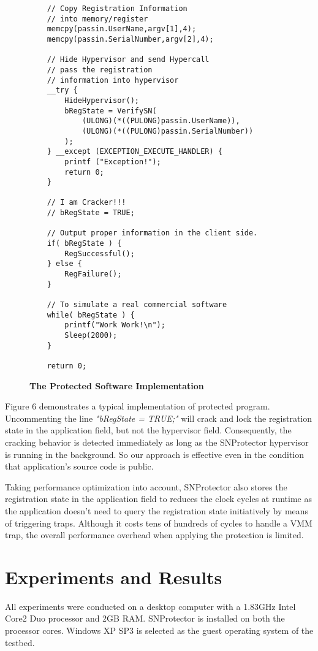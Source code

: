 \documentclass[conference]{IEEEtran}
\begin{document}
{\begin{figure}[!htb]
\begin{lstlisting}
    // Copy Registration Information
    // into memory/register
    memcpy(passin.UserName,argv[1],4);
    memcpy(passin.SerialNumber,argv[2],4);

    // Hide Hypervisor and send Hypercall
    // pass the registration
    // information into hypervisor
    __try {
        HideHypervisor();
        bRegState = VerifySN(
            (ULONG)(*((PULONG)passin.UserName)),
            (ULONG)(*((PULONG)passin.SerialNumber))
        );
    } __except (EXCEPTION_EXECUTE_HANDLER) {
        printf ("Exception!");
        return 0;
    }

    // I am Cracker!!!
    // bRegState = TRUE;

    // Output proper information in the client side.
    if( bRegState ) {
        RegSuccessful();
    } else {
        RegFailure();
    }

    // To simulate a real commercial software
    while( bRegState ) {
        printf("Work Work!\n");
        Sleep(2000);
    }

    return 0;
\end{lstlisting}
\caption{{\bf The Protected Software Implementation}}
\label{Figure 10.}
\end{figure}

Figure 6 demonstrates a typical implementation of protected
program. Uncommenting the line \emph{"bRegState = TRUE;"} will
crack and lock the registration state in the application field,
but not the hypervisor field. Consequently, the cracking behavior
is detected immediately as long as the SNProtector hypervisor is
running in the background. So our approach is effective even in
the condition that application's source code is public.

Taking performance optimization into account, SNProtector also
stores the registration state in the application field to reduces
the clock cycles at runtime as the application doesn't need to
query the registration state initiatively by means of triggering
traps. Although it costs tens of hundreds of cycles to handle a
VMM trap, the overall performance overhead when applying the
protection is limited.

\bigskip

\section{Experiments and Results}
All experiments were conducted on a desktop computer with a
1.83GHz Intel Core2 Duo processor and 2GB RAM. SNProtector is
installed on both the processor cores. Windows XP SP3 is selected
as the guest operating system of the testbed.

}
\end{document}
